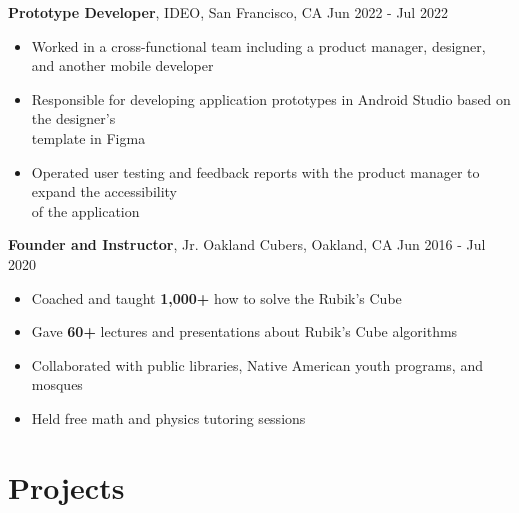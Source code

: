 \documentclass[letterpaper, 10pt]{article}
\newcommand{\secEndSpace}{\vspace{5pt}}
\begin{document}
\noindent \normalsize \textbf{Prototype Developer}, IDEO, San Francisco, CA \hfill \normalsize{Jun 2022 - Jul 2022}\\
\setlength \parindent{1cm} 
    \vspace{-16pt}
    \noindent \hspace{-10pt} \begin{itemize} 
        \item Worked in a cross-functional team including a product manager, designer,\\
        and another mobile developer
        \vspace{-6pt}
        \item Responsible for developing application prototypes in Android Studio based on the designer's\\
        template in Figma
        \vspace{-6pt}
        \item Operated user testing and feedback reports with the product manager to expand the accessibility\\
        of the application
    \end{itemize}

\noindent \normalsize \textbf{Founder and Instructor}, Jr. Oakland Cubers, Oakland, CA \hfill \normalsize{Jun 2016 - Jul 2020}\\
\setlength \parindent{1cm} 
    \vspace{-16pt}
    \noindent \hspace{-10pt} \begin{itemize} 
        \item Coached and taught \textbf{1,000+} how to solve the Rubik's Cube
        \vspace{-6pt}
        \item Gave \textbf{60+} lectures and presentations about Rubik's Cube algorithms
        \vspace{-6pt}
        \item Collaborated with public libraries, Native American youth programs, and mosques 
        \vspace{-6pt}
        \item Held free math and physics tutoring sessions
    \end{itemize}
\secEndSpace
\vspace{-4pt}
\section{ \color{black} \hspace{-8pt} \large \textbf{Projects} }
\end{document}
